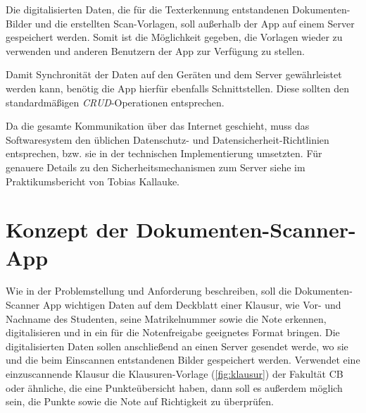 \documentclass[nomenclature, oneside, 150]{HSMW-Thesis}
\begin{document}
	Die digitalisierten Daten, die für die Texterkennung entstandenen Dokumenten-Bilder und die erstellten Scan-Vorlagen, soll außerhalb der App auf einem Server gespeichert werden. Somit ist die Möglichkeit gegeben, die Vorlagen wieder zu verwenden und anderen Benutzern der App zur Verfügung zu stellen. 
	
	Damit Synchronität der Daten auf den Geräten und dem Server gewährleistet werden kann, benötig die App hierfür ebenfalls Schnittstellen. Diese sollten den standardmäßigen \textit{CRUD}-Operationen entsprechen. 
	
	Da die gesamte Kommunikation über das Internet geschieht, muss das Softwaresystem den üblichen Datenschutz- und Datensicherheit-Richtlinien entsprechen, bzw. sie in der technischen Implementierung umsetzten. Für genauere Details zu den Sicherheitsmechanismen zum Server siehe im Praktikumsbericht von Tobias Kallauke. 


\chapter{Konzept der Dokumenten-Scanner-App}\label{ch:konzept}

	Wie in der Problemstellung und Anforderung beschreiben, soll die Dokumenten-Scanner App wichtigen Daten auf dem Deckblatt einer Klausur, wie Vor- und Nachname des Studenten, seine Matrikelnummer sowie die Note erkennen, digitalisieren und in ein für die Notenfreigabe geeignetes Format bringen. Die digitalisierten Daten sollen anschließend an einen Server gesendet werde, wo sie und die beim Einscannen entstandenen Bilder gespeichert werden. Verwendet eine einzuscannende Klausur die Klausuren-Vorlage (\ref{fig:klausur}) der Fakultät CB oder ähnliche, die eine Punkteübersicht haben, dann soll es außerdem möglich sein, die Punkte sowie die Note auf Richtigkeit zu überprüfen. 
\end{document}
